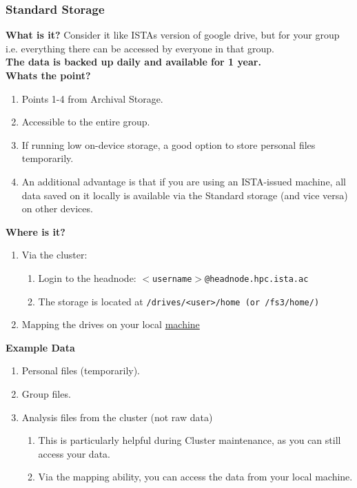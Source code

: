 \documentclass{article}
\begin{document}
\subsubsection{Standard Storage}
\textbf{What is it?}
\newline
Consider it like ISTAs version of google drive, but for your group i.e. everything there can be accessed by everyone in that group.
\\
\textbf{The data is backed up daily and available for 1 year.}
\\

\noindent
\textbf{Whats the point?}
\newline
\begin{enumerate}
    \item Points 1-4 from Archival Storage.
    \item Accessible to the entire group.
    \item If running low on-device storage, a good option to store personal files temporarily. 
    \item An additional advantage is that if you are using an ISTA-issued machine, all data saved on it locally is available via the Standard storage (and vice versa) on other devices.
\end{enumerate}

\noindent
\textbf{Where is it?}
\newline
\begin{enumerate}
    \item Via the cluster: 
    \begin{enumerate}
        \item Login to the headnode: \texttt{$<$username$>$@headnode.hpc.ista.ac}
        \item The storage is located at \texttt{/drives/<user>/home (or /fs3/home/)}
    \end{enumerate}
    \item Mapping the drives on your local \href{https://it.pages.ist.ac.at/docs/it-documentation/fileservers/fileshare/}{machine}
\end{enumerate}

\noindent
\textbf{Example Data}
\begin{enumerate}
    \item Personal files (temporarily).
    \item Group files.
    \item Analysis files from the cluster (not raw data)
    \begin{enumerate}
        \item This is particularly helpful during Cluster maintenance, as you can still access your data.
        \item Via the mapping ability, you can access the data from your local machine.
    \end{enumerate}

\end{enumerate}
\end{document}
